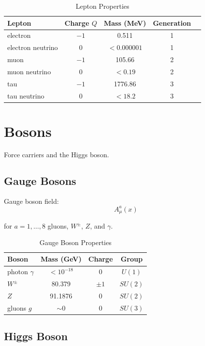 \begin{table}[h]
\centering
\caption{Lepton Properties}
\begin{tabular}{lcccc}
\toprule
Lepton & Charge $Q$ & Mass (MeV) & Generation \\
\midrule
electron & $-1$ & 0.511 & 1 \\
electron neutrino & $0$ & $<0.000001$ & 1 \\
muon & $-1$ & 105.66 & 2 \\
muon neutrino & $0$ & $<0.19$ & 2 \\
tau & $-1$ & 1776.86 & 3 \\
tau neutrino & $0$ & $<18.2$ & 3 \\
\bottomrule
\end{tabular}
\end{table}

\section{Bosons}

Force carriers and the Higgs boson.

\subsection{Gauge Bosons}

\begin{definition}
\label{def:gauge-boson}
Gauge boson field:
\begin{equation}
A_\mu^a(x)
\end{equation}

for $a = 1,\ldots,8$ gluons, $W^\pm$, $Z$, and $\gamma$.
\end{definition}

\begin{table}[h]
\centering
\caption{Gauge Boson Properties}
\begin{tabular}{lccc}
\toprule
Boson & Mass (GeV) & Charge & Group \\
\midrule
photon $\gamma$ & $<10^{-18}$ & 0 & $U(1)$ \\
$W^\pm$ & 80.379 & $\pm1$ & $SU(2)$ \\
$Z$ & 91.1876 & 0 & $SU(2)$ \\
gluons $g$ & $\sim 0$ & 0 & $SU(3)$ \\
\bottomrule
\end{tabular}
\end{table}

\subsection{Higgs Boson}

